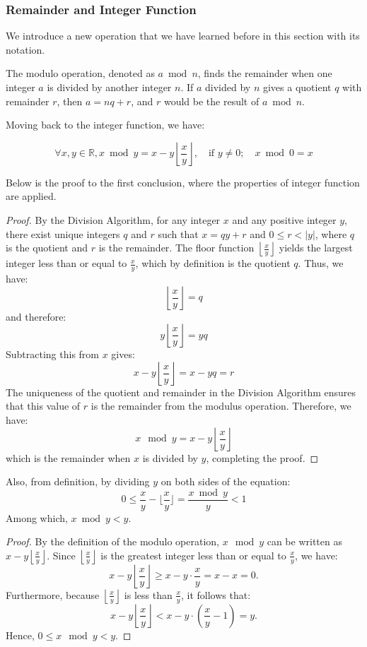 \subsubsection{Remainder and Integer Function}
We introduce a new operation that we have learned before in this section with its notation.
\begin{notation}
    The modulo operation, denoted as \( a \bmod n \), finds the remainder when one integer \( a \) is divided by another integer \( n \). 
    If \( a \) divided by \( n \) gives a quotient \( q \) with remainder \( r \), then \( a = nq + r \), and \( r \) would be the result of \( a \bmod n \).
\end{notation}

Moving back to the integer function, we have:
\begin{theorem}
    $$\forall x, y \in \mathbb{R}, x \bmod y = x - y\left\lfloor \frac{x}{y} \right\rfloor, \quad \text{if } y \neq 0; \quad x \bmod 0 = x$$
\end{theorem}
Below is the proof to the first conclusion, where the properties of integer function are applied.
\begin{proof}
    By the Division Algorithm, for any integer \( x \) and any positive integer \( y \), there exist unique integers \( q \) and \( r \) such that \( x = qy + r \) and \( 0 \leq r < |y| \), where \( q \) is the quotient and \( r \) is the remainder. The floor function \( \left\lfloor \frac{x}{y} \right\rfloor \) yields the largest integer less than or equal to \( \frac{x}{y} \), which by definition is the quotient \( q \). Thus, we have:
\[
\left\lfloor \frac{x}{y} \right\rfloor = q
\]
and therefore:
\[
y\left\lfloor \frac{x}{y} \right\rfloor = yq
\]
Subtracting this from \( x \) gives:
\[
x - y\left\lfloor \frac{x}{y} \right\rfloor = x - yq = r
\]
The uniqueness of the quotient and remainder in the Division Algorithm ensures that this value of \( r \) is the remainder from the modulus operation. Therefore, we have:
\[
x \mod y = x - y\left\lfloor \frac{x}{y} \right\rfloor
\]
which is the remainder when \( x \) is divided by \( y \), completing the proof.

\end{proof}
Also, from definition, by dividing $y$ on both sides of the equation:
$$0\leq \frac{x}{y} - \lfloor\frac{x}{y}\rfloor = \frac{x \bmod y}{y} < 1$$
Among which, $x \bmod y <y$. 
\begin{proof}
    
        By the definition of the modulo operation, \( x \mod y \) can be written as \( x - y\left\lfloor \frac{x}{y} \right\rfloor \). Since \( \left\lfloor \frac{x}{y} \right\rfloor \) is the greatest integer less than or equal to \( \frac{x}{y} \), we have:
        \[
        x - y\left\lfloor \frac{x}{y} \right\rfloor \geq x - y \cdot \frac{x}{y} = x - x = 0.
        \]
        Furthermore, because \( \left \lfloor \frac{x}{y} \right\rfloor \) is less than \( \frac{x}{y} \), it follows that:
        \[
        x - y\left\lfloor \frac{x}{y} \right\rfloor < x - y \cdot \left(\frac{x}{y} - 1\right) = y.
        \]
        Hence, \( 0 \leq x \mod y < y \).

\end{proof}
